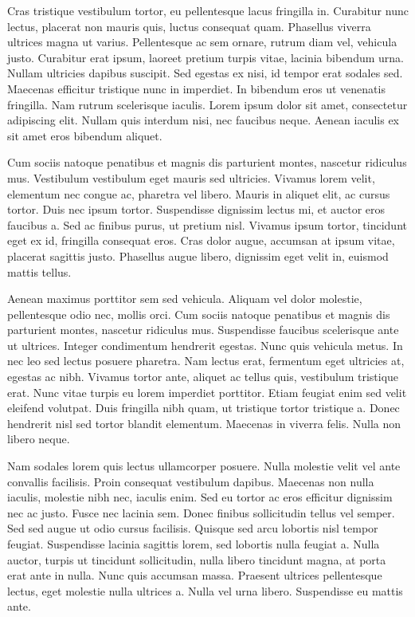 Cras tristique vestibulum tortor, eu pellentesque lacus fringilla in. Curabitur nunc lectus, placerat non mauris quis, luctus consequat quam. Phasellus viverra ultrices magna ut varius. Pellentesque ac sem ornare, rutrum diam vel, vehicula justo. Curabitur erat ipsum, laoreet pretium turpis vitae, lacinia bibendum urna. Nullam ultricies dapibus suscipit. Sed egestas ex nisi, id tempor erat sodales sed. Maecenas efficitur tristique nunc in imperdiet. In bibendum eros ut venenatis fringilla. Nam rutrum scelerisque iaculis. Lorem ipsum dolor sit amet, consectetur adipiscing elit. Nullam quis interdum nisi, nec faucibus neque. Aenean iaculis ex sit amet eros bibendum aliquet.

Cum sociis natoque penatibus et magnis dis parturient montes, nascetur ridiculus mus. Vestibulum vestibulum eget mauris sed ultricies. Vivamus lorem velit, elementum nec congue ac, pharetra vel libero. Mauris in aliquet elit, ac cursus tortor. Duis nec ipsum tortor. Suspendisse dignissim lectus mi, et auctor eros faucibus a. Sed ac finibus purus, ut pretium nisl. Vivamus ipsum tortor, tincidunt eget ex id, fringilla consequat eros. Cras dolor augue, accumsan at ipsum vitae, placerat sagittis justo. Phasellus augue libero, dignissim eget velit in, euismod mattis tellus.

Aenean maximus porttitor sem sed vehicula. Aliquam vel dolor molestie, pellentesque odio nec, mollis orci. Cum sociis natoque penatibus et magnis dis parturient montes, nascetur ridiculus mus. Suspendisse faucibus scelerisque ante ut ultrices. Integer condimentum hendrerit egestas. Nunc quis vehicula metus. In nec leo sed lectus posuere pharetra. Nam lectus erat, fermentum eget ultricies at, egestas ac nibh. Vivamus tortor ante, aliquet ac tellus quis, vestibulum tristique erat. Nunc vitae turpis eu lorem imperdiet porttitor. Etiam feugiat enim sed velit eleifend volutpat. Duis fringilla nibh quam, ut tristique tortor tristique a. Donec hendrerit nisl sed tortor blandit elementum. Maecenas in viverra felis. Nulla non libero neque.

Nam sodales lorem quis lectus ullamcorper posuere. Nulla molestie velit vel ante convallis facilisis. Proin consequat vestibulum dapibus. Maecenas non nulla iaculis, molestie nibh nec, iaculis enim. Sed eu tortor ac eros efficitur dignissim nec ac justo. Fusce nec lacinia sem. Donec finibus sollicitudin tellus vel semper. Sed sed augue ut odio cursus facilisis. Quisque sed arcu lobortis nisl tempor feugiat. Suspendisse lacinia sagittis lorem, sed lobortis nulla feugiat a. Nulla auctor, turpis ut tincidunt sollicitudin, nulla libero tincidunt magna, at porta erat ante in nulla. Nunc quis accumsan massa. Praesent ultrices pellentesque lectus, eget molestie nulla ultrices a. Nulla vel urna libero. Suspendisse eu mattis ante. 

